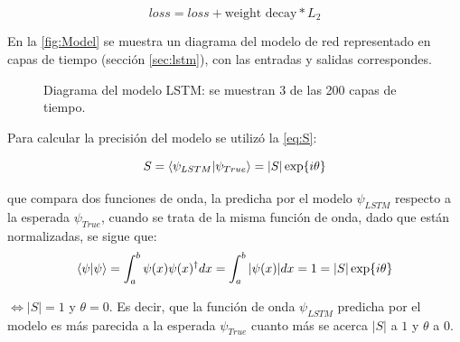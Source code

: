 \[ loss = loss + \text{weight decay}*L_2\]

En la \autoref{fig:Model} se muestra un diagrama del modelo de red representado en capas de tiempo (sección \autoref{sec:lstm}), con las entradas y salidas correspondes.

\begin{figure}[!htbp]
  \centering
  \caption{Diagrama del modelo \acs{LSTM}: se muestran 3 de las 200 capas de tiempo.}
  \label{fig:Model}
\end{figure}

Para calcular la precisión del modelo se utilizó la \autoref{eq:S}:

\begin{equation}
  \label{eq:S}
  S = \bra{\psi_{LSTM}}\ket{\psi_{True}} = |S|\exp{i\theta}
\end{equation}

que compara dos funciones de onda, la predicha por el modelo $\psi_{LSTM}$ respecto a la esperada $\psi_{True}$, cuando se trata de la misma función de onda, dado que están normalizadas, se sigue que:
\begin{equation*}
  \bra{\psi}\ket{\psi} = \int_{a}^{b}\psi(x) \psi(x)^\dag dx = \int_{a}^{b}|\psi(x)| dx = 1 = |S|\exp{i\theta}
\end{equation*}

$\iff |S|=1$ y $\theta =0$. Es decir, que la función de onda $\psi_{LSTM}$ predicha por el modelo es más parecida a la esperada $\psi_{True}$ cuanto más se acerca $|S|$ a $1$ y $\theta$ a $0$. \\

